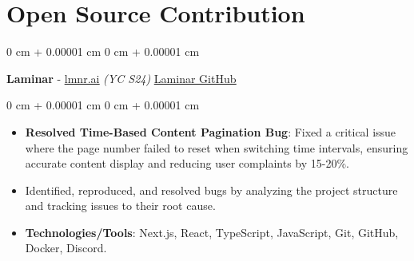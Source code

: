 \documentclass[10pt, letterpaper]{article}
\newenvironment{highlights}{
    \begin{itemize}[
        topsep=0.10 cm,
        parsep=0.10 cm,
        partopsep=0pt,
        itemsep=0pt,
        leftmargin=0 cm + 10pt
    ]
}{
    \end{itemize}
} %
\newenvironment{highlightsforbulletentries}{
    \begin{itemize}[
        topsep=0.10 cm,
        parsep=0.10 cm,
        partopsep=0pt,
        itemsep=0pt,
        leftmargin=10pt
    ]
}{
    \end{itemize}
} %
\newenvironment{onecolentry}{
    \begin{adjustwidth}{
        0 cm + 0.00001 cm
    }{
        0 cm + 0.00001 cm
    }
}{
    \end{adjustwidth}
} %
\newenvironment{twocolentry}[2][]{
    \onecolentry
    \def\secondColumn{#2}
    \setcolumnwidth{\fill, 4.5 cm}
    \begin{paracol}{2}
}{
    \switchcolumn \raggedleft \secondColumn
    \end{paracol}
    \endonecolentry
} %
\begin{document}


    
\section{Open Source Contribution}
        \vspace{0.10 cm}

       \begin{twocolentry}{
            \href{https://github.com/lmnr-ai/lmnr}{\underline{Laminar GitHub}}
        }
            {\textbf{Laminar} - \href{https://www.lmnr.ai/}{\underline{lmnr.ai}} \textit{(YC S24)}}\end{twocolentry}
        \vspace{0.10 cm}

 \begin{onecolentry}
     
    \begin{highlightsforbulletentries}
        \item \textbf{Resolved Time-Based Content Pagination Bug}: Fixed a critical issue where the page number failed to reset when switching time intervals, ensuring accurate content display and reducing user complaints by 15-20\%.
        \item Identified, reproduced, and resolved bugs by analyzing the project structure and tracking issues to their root cause.
        \item \textbf{Technologies/Tools}: Next.js, React, TypeScript, JavaScript, Git, GitHub, Docker, Discord.
    \end{highlightsforbulletentries}
\end{onecolentry}
\end{document}
